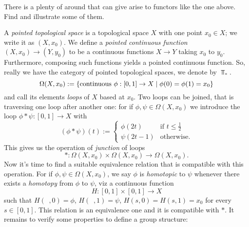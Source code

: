 \begin{exercise}
There is a plenty of  around that can give arise to functors like the one above. Find and illustrate some of them.
\end{exercise}

\begin{example}
A {\em pointed topological space} is a topological space \(X\) with one point \(x_0 \in X\); we write it as \((X, x_0)\). We define a {\em pointed continuous function} \((X, x_0) \to (Y, y_0)\) to be a continuous functions \(X \to Y\) taking \(x_0\) to \(y_0\). Furthermore, composing such functions yields a pointed continuous function. So, really we have the category of pointed topological spaces, we denote by \(\Top_\ast\).%
\[\Omega(X, x_0) := \left\{\text{continuous } \phi : [0,1] \to X \mid \phi(0) = \phi(1) = x_0\right\}\]
and call its elements {\em loops} of \(X\) based at \(x_0\). %
Two loops can be joined, that is traversing one loop after another one: for if \(\phi, \psi \in \Omega(X, x_0)\) we introduce the loop \(\phi \ast \psi : [0,1] \to X\) with
\[(\phi \ast \psi) (t) := \begin{cases} \phi(2t) & \text{if } t \le \frac12 \\ \psi(2t-1) & \text{otherwise.} \end{cases}\]
This gives us the operation of {\em junction} of loops
\[\ast : \Omega(X, x_0) \times \Omega(X, x_0) \to \Omega(X, x_0) .\]
Now it's time to find a suitable equivalence relation that is compatible with this operation. For if \(\phi, \psi \in \Omega(X, x_0)\), we say \(\phi\) is {\em homotopic} to \(\psi\) whenever there exists a {\em homotopy} from \(\phi\) to \(\psi\), viz a continuous function
\[H : [0,1] \times [0,1] \to X\]
such that \(H(\phantom{s}, 0) = \phi\), \(H(\phantom{s}, 1) = \psi\), \(H(s, 0) = H(s, 1) = x_0\) for every \(s \in [0, 1]\). This relation is an equivalence one and it is compatible with \(\ast\). It remains to verify some properties to define a group structure:

\end{example}
